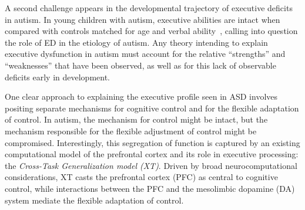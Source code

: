A second challenge appears in the developmental trajectory of
executive deficits in autism.  In young children with autism,
executive abilities are intact when compared with controls matched for
age and verbal ability~\cite{GriffithEM:1999:AutismYoungED}, calling
into question the role of ED in the etiology of autism.  Any theory
intending to explain executive dysfunction in autism must account for
the relative ``strengths'' and ``weaknesses'' that have been observed,
as well as for this lack of observable deficits early in development.

One clear approach to explaining the executive profile seen in ASD
involves positing separate mechanisms for cognitive control and for
the flexible adaptation of control.  In autism, the mechanism for
control might be intact, but the mechanism responsible for the flexible
adjustment of control might be compromised.  Interestingly, this
segregation of function is captured by an existing computational model
of the prefrontal cortex and its role in executive processing: the
\emph{Cross-Task Generalization model (XT)}.  Driven by broad
neurocomputational considerations, XT casts the prefrontal cortex
(PFC) as central to cognitive control, while interactions between the
PFC and the mesolimbic dopamine (DA) system mediate the flexible
adaptation of control.  


